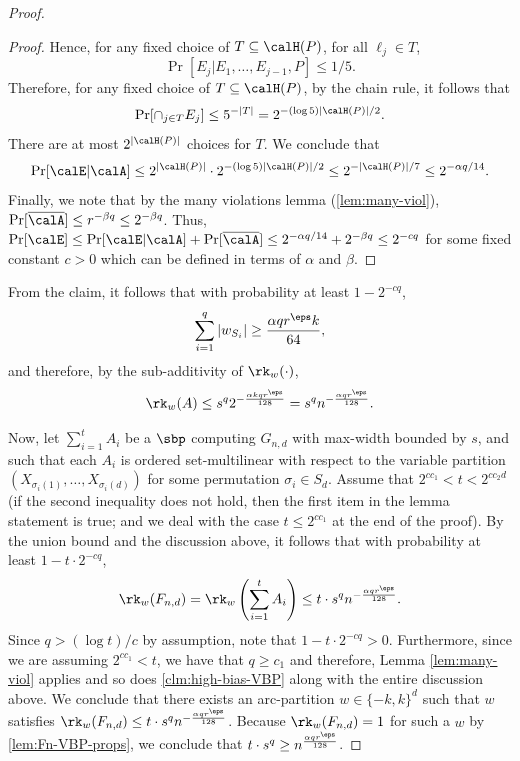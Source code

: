 \documentclass{article}
\begin{document}
\begin{proof}
\begin{proof}
Hence, for any fixed choice of $T\subseteq \calH(P)$, for all $\ell_j \in T$,
\[
\Pr[E_j|E_1,\ldots,E_{j-1},P] \leq 1/5.
\]
Therefore, for any fixed choice of $T\subseteq \calH(P)$, by the chain rule, it follows that 
\[
\Pr[\cap_{j\in T}E_j]\leq 5^{-|T|} = 2^{-(\log 5)|\calH(P)|/2}.
\]
There are at most $2^{|\calH(P)|}$ choices for $T$. We conclude that 
\[\Pr[\calE|\calA]\leq 2^{|\calH(P)|} \cdot 2^{-(\log 5)|\calH(P)|/2}\leq 2^{-|\calH(P)|/7}\leq 2^{-\alpha q/14}.
\]
Finally, we note that by the many violations lemma (\autoref{lem:many-viol}), $\Pr[\overline{\calA}]\leq r^{-\beta q}\leq 2^{-\beta q}$. Thus, $\Pr[\calE] \leq \Pr[\calE|\calA] + \Pr[\overline{\calA}] \leq 2^{-\alpha q/14} + 2^{-\beta q} \leq 2^{-cq}$ for some fixed constant $c>0$ which can be defined in terms of $\alpha$ and $\beta$.
\end{proof}

From the claim, it follows that with probability at least $1 - 2^{-cq}$, 
\[
\sum_{i=1}^q |w_{S_i}| \geq \frac{\alpha qr^\eps k}{64},
\]
and therefore, by the sub-additivity of $\rk_w(\cdot)$,
\[
\rk_w(A) \leq s^q 2^{-\frac{\alpha kqr^\eps }{128}} = s^q n^{-{\frac{\alpha qr^\eps }{128}}}.
\]

Now, let $\sum_{i=1}^t A_i$ be a $\sbp$ computing $G_{n,d}$ with max-width bounded by $s$, and such that each $A_i$ is ordered set-multilinear with respect to the variable partition $(X_{\sigma_i(1)},\ldots, X_{\sigma_i(d)})$ for some permutation $\sigma_i\in S_d$. Assume that $2^{cc_1}< t< 2^{cc_2d}$ (if the second inequality does not hold, then the first item in the lemma statement is true; and we deal with the case $t\leq 2^{cc_1}$ at the end of the proof). %
By the union bound and the discussion above, it follows that with probability at least $1-t\cdot 2^{-cq}$, 
\[
\rk_w(F_{n,d}) = \rk_w\left(\sum_{i=1}^t A_i\right) \leq t\cdot s^q n^{-{\frac{\alpha qr^\eps }{128}}}.
\]
Since $q> (\log t)/c$ by assumption, note that $1-t\cdot 2^{-cq}>0$. Furthermore, since we are assuming $2^{cc_1}< t$, we have that $q\geq c_1$ and therefore, Lemma \ref{lem:many-viol} applies and so does \autoref{clm:high-bias-VBP} along with the entire discussion above. We conclude that there exists an arc-partition $w\in \{-k,k\}^d$ such that $w$ satisfies $
\rk_w(F_{n,d})\leq t\cdot s^q n^{-{\frac{\alpha qr^\eps }{128}}}$. Because $\rk_w(F_{n,d}) = 1$ for such a $w$ by \autoref{lem:Fn-VBP-props}, we conclude that $t\cdot s^q \geq n^{{\frac{\alpha qr^\eps }{128}}}$.


\end{proof}
\end{document}
